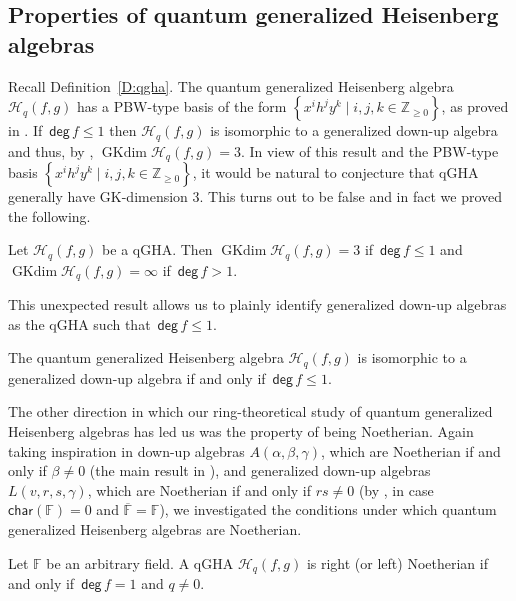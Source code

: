 \documentclass{commat}
\newcommand{\FF}{\mathbb{F}}
\newcommand{\ZZ}{\mathbb{Z}}
\newcommand\chara{\mathsf {char}}
\newcommand{\barr}[1]{\overline{#1}}
\newcommand{\hqfg}[1][f,g]{\mathcal{H}_q(#1)}
\newcommand\degg{\, \mathsf{deg} \,}
\newcommand{\pb}[1]{\left\{ #1\right\}}
\begin{document}
\subsection{Properties of quantum generalized Heisenberg algebras}\label{SS:rt:qgha}

Recall Definition~\ref{D:qgha}. The quantum generalized Heisenberg algebra $\hqfg$ has a PBW-type basis of the form $\pb{x^i h^j y^k \mid i, j, k\in \ZZ_{\geq 0}}$, as proved in \cite[Lem.\ 2.2]{LR22ca}.
If $\degg f\leq 1$ then $\hqfg$ is isomorphic to a generalized down-up algebra and thus, by \cite[Cor.\ 2.4]{CS04}, $\operatorname{GKdim}\hqfg=3$. In view of this result and the PBW-type basis $\pb{x^i h^j y^k \mid i, j, k\in \ZZ_{\geq 0}}$, it would be natural to conjecture that qGHA generally have GK-dimension $3$. This turns out to be false and in fact we proved the following.

\begin{corollary}\label{P:basic:GK}
	Let $\hqfg$ be a qGHA. Then $\operatorname{GKdim}\hqfg=3$ if $\degg f\leq 1$ and $\operatorname{GKdim}\hqfg=\infty$ if $\degg f>1$.
\end{corollary}

This unexpected result allows us to plainly identify generalized down-up algebras as the qGHA such that $\degg f\leq1$.

\begin{corollary}\label{gduaimpdf1}
	The quantum generalized Heisenberg algebra $\hqfg$ is isomorphic to a generalized down-up algebra if and only if $\degg f\leq1$.
\end{corollary}

The other direction in which our ring-theoretical study of quantum generalized Heisenberg algebras has led us was the property of being Noetherian. Again taking inspiration in down-up algebras $A(\alpha, \beta, \gamma)$, which are Noetherian if and only if $\beta\neq 0$ (the main result in \cite{KMP99}), and generalized down-up algebras $L(v, r, s, \gamma)$, which are Noetherian if and only if $rs\neq 0$ (by \cite[Prop.\ 2.5, Prop.\ 2.6]{CS04}, in case $\chara(\FF)=0$ and $\barr\FF=\FF$), we investigated the conditions under which quantum generalized Heisenberg algebras are Noetherian. 

\begin{proposition}\label{P:noetherian} Let $\FF$ be an arbitrary field.
	A qGHA $\hqfg$ is right (or left) Noetherian if and only if $\degg f=1$ and $q\neq0$.
\end{proposition}
\end{document}
